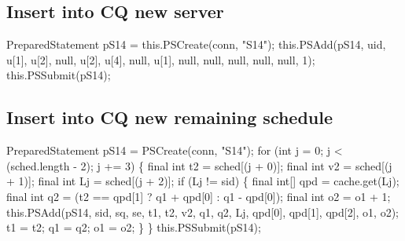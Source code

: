 \subsection{Insert into CQ new server}
\nwenddocs{}\endmoddef{}
PreparedStatement pS14 = this.PSCreate(conn, "S14");
this.PSAdd(pS14, uid, u[1], u[2], null, u[2], u[4], null, u[1],
    null, null, null, null, null, 1);
this.PSSubmit(pS14);
\nwendcode{}\nwdocspar

\subsection{Insert into CQ new remaining schedule}
\nwenddocs{}\endmoddef{}
PreparedStatement pS14 = PSCreate(conn, "S14");
for (int j = 0; j < (sched.length - 2); j += 3) \{
  final int t2 = sched[(j + 0)];
  final int v2 = sched[(j + 1)];
  final int Lj = sched[(j + 2)];
  if (Lj != sid) \{
    final int[] qpd = cache.get(Lj);
    final int q2 = (t2 == qpd[1] ? q1 + qpd[0] : q1 - qpd[0]);
    final int o2 = o1 + 1;
    this.PSAdd(pS14, sid, sq, se, t1, t2, v2, q1, q2, Lj,
          qpd[0], qpd[1], qpd[2], o1, o2);
    t1 = t2;
    q1 = q2;
    o1 = o2;
  \}
\}
this.PSSubmit(pS14);
\nwendcode{}\nwdocspar

